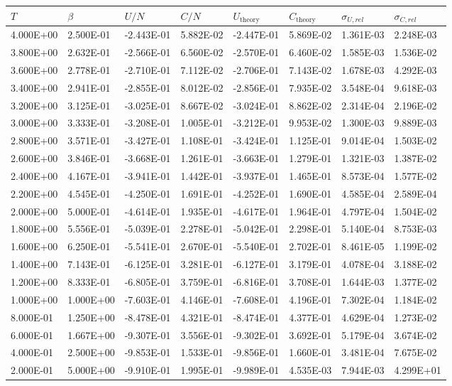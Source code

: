 \begin{tabular}{ | l | l | l | l | l | l | l | l | }
    \hline
    $T$       & $\beta$   & $U/N$      & $C/N$     & $U_\text{theory}$ & $C_\text{theory}$ & $\sigma_{U,rel}$ & $\sigma_{C,rel}$ \\
    \hline
    \hline
    4.000E+00 & 2.500E-01 & -2.443E-01 & 5.882E-02 & -2.447E-01 & 5.869E-02 & 1.361E-03 & 2.248E-03 \\ \hline
    3.800E+00 & 2.632E-01 & -2.566E-01 & 6.560E-02 & -2.570E-01 & 6.460E-02 & 1.585E-03 & 1.536E-02 \\ \hline
    3.600E+00 & 2.778E-01 & -2.710E-01 & 7.112E-02 & -2.706E-01 & 7.143E-02 & 1.678E-03 & 4.292E-03 \\ \hline
    3.400E+00 & 2.941E-01 & -2.855E-01 & 8.012E-02 & -2.856E-01 & 7.935E-02 & 3.548E-04 & 9.618E-03 \\ \hline
    3.200E+00 & 3.125E-01 & -3.025E-01 & 8.667E-02 & -3.024E-01 & 8.862E-02 & 2.314E-04 & 2.196E-02 \\ \hline
    3.000E+00 & 3.333E-01 & -3.208E-01 & 1.005E-01 & -3.212E-01 & 9.953E-02 & 1.300E-03 & 9.889E-03 \\ \hline
    2.800E+00 & 3.571E-01 & -3.427E-01 & 1.108E-01 & -3.424E-01 & 1.125E-01 & 9.014E-04 & 1.503E-02 \\ \hline
    2.600E+00 & 3.846E-01 & -3.668E-01 & 1.261E-01 & -3.663E-01 & 1.279E-01 & 1.321E-03 & 1.387E-02 \\ \hline
    2.400E+00 & 4.167E-01 & -3.941E-01 & 1.442E-01 & -3.937E-01 & 1.465E-01 & 8.573E-04 & 1.577E-02 \\ \hline
    2.200E+00 & 4.545E-01 & -4.250E-01 & 1.691E-01 & -4.252E-01 & 1.690E-01 & 4.585E-04 & 2.589E-04 \\ \hline
    2.000E+00 & 5.000E-01 & -4.614E-01 & 1.935E-01 & -4.617E-01 & 1.964E-01 & 4.797E-04 & 1.504E-02 \\ \hline
    1.800E+00 & 5.556E-01 & -5.039E-01 & 2.278E-01 & -5.042E-01 & 2.298E-01 & 5.140E-04 & 8.753E-03 \\ \hline
    1.600E+00 & 6.250E-01 & -5.541E-01 & 2.670E-01 & -5.540E-01 & 2.702E-01 & 8.461E-05 & 1.199E-02 \\ \hline
    1.400E+00 & 7.143E-01 & -6.125E-01 & 3.281E-01 & -6.127E-01 & 3.179E-01 & 4.078E-04 & 3.188E-02 \\ \hline
    1.200E+00 & 8.333E-01 & -6.805E-01 & 3.759E-01 & -6.816E-01 & 3.708E-01 & 1.644E-03 & 1.377E-02 \\ \hline
    1.000E+00 & 1.000E+00 & -7.603E-01 & 4.146E-01 & -7.608E-01 & 4.196E-01 & 7.302E-04 & 1.184E-02 \\ \hline
    8.000E-01 & 1.250E+00 & -8.478E-01 & 4.321E-01 & -8.474E-01 & 4.377E-01 & 4.629E-04 & 1.273E-02 \\ \hline
    6.000E-01 & 1.667E+00 & -9.307E-01 & 3.556E-01 & -9.302E-01 & 3.692E-01 & 5.179E-04 & 3.674E-02 \\ \hline
    4.000E-01 & 2.500E+00 & -9.853E-01 & 1.533E-01 & -9.856E-01 & 1.660E-01 & 3.481E-04 & 7.675E-02 \\ \hline
    2.000E-01 & 5.000E+00 & -9.910E-01 & 1.995E-01 & -9.989E-01 & 4.535E-03 & 7.944E-03 & 4.299E+01 \\
    \hline
\end{tabular}